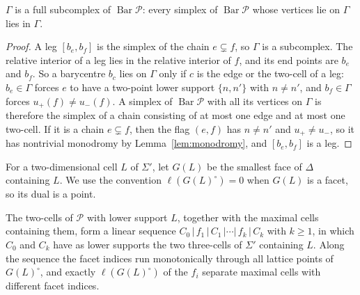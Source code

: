 \begin{lemma}\label{lem:full}
$\Gamma$ is a full subcomplex of $\operatorname{Bar}\mathscr P$: every simplex of $\operatorname{Bar}\mathscr P$ whose
vertices lie on $\Gamma$ lies in $\Gamma$.
\end{lemma}

\begin{proof}
A leg $[b_e,b_f]$ is the simplex of the chain $e\subsetneq f$, so $\Gamma$ is a subcomplex. The relative interior of a leg lies in
the relative interior of $f$, and its end points are $b_e$ and $b_f$. So a barycentre $b_c$ lies on $\Gamma$ only if $c$ is the
edge or the two-cell of a leg: $b_e\in\Gamma$ forces $e$ to have a two-point lower support $\{n,n'\}$ with $n\ne n'$, and
$b_f\in\Gamma$ forces $u_+(f)\neq u_-(f)$. A simplex of $\operatorname{Bar}\mathscr P$ with all its vertices on $\Gamma$ is
therefore the simplex of a chain consisting of at most one edge and at most one two-cell. If it is a chain $e\subsetneq f$,
then the flag $(e,f)$ has $n\ne n'$ and $u_+\neq u_-$, so it has nontrivial monodromy by Lemma~\ref{lem:monodromy}, and
$[b_e,b_f]$ is a leg.
\end{proof}

For a two-dimensional cell $L$ of $\Sigma'$, let $G(L)$ be the smallest face of $\Delta$ containing $L$.
We use the convention $\ell(G(L)^\circ)=0$ when $G(L)$ is a facet, so its dual is a point.

\begin{lemma}\label{lem:stack}
The two-cells of $\mathscr P$ with lower support $L$, together with the maximal cells containing them, form a linear sequence
$C_0\,|\,f_1\,|\,C_1\,|\cdots|\,f_k\,|\,C_k$ with $k\ge1$, in which $C_0$ and $C_k$ have as lower supports the two three-cells of
$\Sigma'$ containing $L$. Along the sequence the facet indices run monotonically through all lattice points of $G(L)^\circ$, and
exactly $\ell(G(L)^\circ)$ of the $f_i$ separate maximal cells with different facet indices.
\end{lemma}

